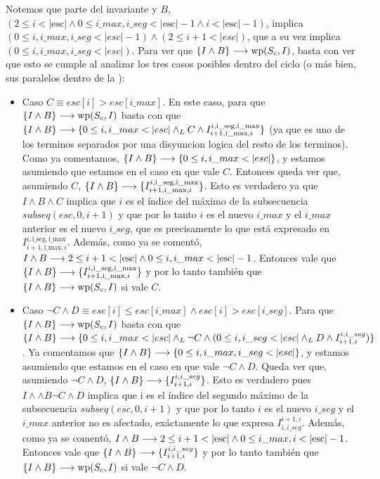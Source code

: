 \documentclass[10pt,a4paper]{article}
\newcommand{\var}{\text}
\renewcommand{\wp}{\text{wp}}
\begin{document}
\begin{enumerate}
    Notemos que parte del invariante y $B$, $(2 \leq i < |\var{esc}| \land 0 \leq i\_max, i\_seg < |\var{esc}| - 1 \land i < |\var{esc}| - 1)$, implica $(0 \leq i, i\_max, i\_seg < |esc| - 1) \land (2 \leq i + 1 < |esc|)$, que a su vez implica $(0 \leq i, i\_max, i\_seg < |esc|)$. Para ver que $\{I \land B\} \implica \wp(S_c, I)$, basta con ver que esto se cumple al analizar los tres casos posibles dentro del ciclo (o más bien, sus paralelos dentro de la \wp):
    \begin{itemize}
        \item Caso $C \equiv esc[i] > esc[i\_max].$ En este caso, para que $\{I \land B\} \implica \wp(S_c, I)$ basta con que $\{I \land B\} \implica \{0 \leq i, i\_max < |esc| \yLuego C \land I_{i+1, \var{i\_max}, i}^{i, \var{i\_seg}, \var{i\_max}}\}$ (ya que es uno de los terminos separados por una disyuncion logica del resto de los terminos). Como ya comentamos, $\{I \land B\} \longrightarrow \{0 \leq i, i\_max < |esc|\}$, y estamos asumiendo que estamos en el caso en que vale $C$. Entonces queda ver que, asumiendo $C$, $\{I \land B\} \implica \{I_{i+1, \var{i\_max}, i}^{i, \var{i\_seg}, \var{i\_max}}\}$. Esto es verdadero ya que $I \land B \land C$ implica que $i$ es el índice del máximo de la subsecuencia $subseq(esc, 0, i+1)$ y que por lo tanto $i$ es el nuevo $i\_max$ y el $i\_max$ anterior es el nuevo $i\_seg$, que es precisamente lo que está expresado en $I_{i+1, \var{i\_max}, i}^{i, \var{i\_seg}, \var{i\_max}}$. Además, como ya se comentó, $I \land B \implica 2 \leq i + 1 < |\var{esc}| \land 0 \leq i, i\_max < |\var{esc}| - 1$. Entonces vale que $\{I \land B\} \implica \{I_{i+1, \var{i\_max}, i}^{i, \var{i\_seg}, \var{i\_max}}\}$ y por lo tanto también que $\{I \land B\} \implica \wp(S_c, I)$ si vale $C$.

        \item Caso $\neg C \land D \equiv esc[i] \leq esc[i\_max] \land esc[i] > esc[i\_seg]$. Para que $\{I \land B\} \implica \wp(S_c, I)$ basta con que $\{I \land B\} \longrightarrow \{0 \leq i, i\_max < |esc| \land _L \neg C \land (0 \leq i, i\_seg < |esc| \land _L D \land I_{i+1,i}^{i,i\_seg})\}$. Ya comentamos que $\{I \land B\} \longrightarrow \{0 \leq i, i\_max, i\_seg < |esc|\}$, y estamos asumiendo que estamos en el caso en que vale $\neg C \land D$. Queda ver que, asumiendo $\neg C \land D$, $\{I \land B\} \longrightarrow \{I_{i+1,i}^{i,i\_seg}\}$. Esto es verdadero pues $I \land \land B \neg C \land D$ implica que i es el índice del segundo máximo de la subsecuencia $subseq(esc, 0, i+1)$ y que por lo tanto $i$ es el nuevo $i\_seg$ y el $i\_max$ anterior no es afectado, exáctamente lo que expresa $I^{i+1,i}_{i,i\_seg}$. Además, como ya se comentó, $I \land B \implica 2 \leq i + 1 < |\var{esc}| \land 0 \leq i\_max, i < |\var{esc}| - 1$. Entonces vale que $\{I \land B\} \longrightarrow \{I_{i+1, i}^{i, i\_seg}\}$ y por lo tanto también que $\{I \land B\} \implica \wp(S_c, I)$ si vale $\neg C \land D$.
    

\end{itemize}
\end{enumerate}
\end{document}
